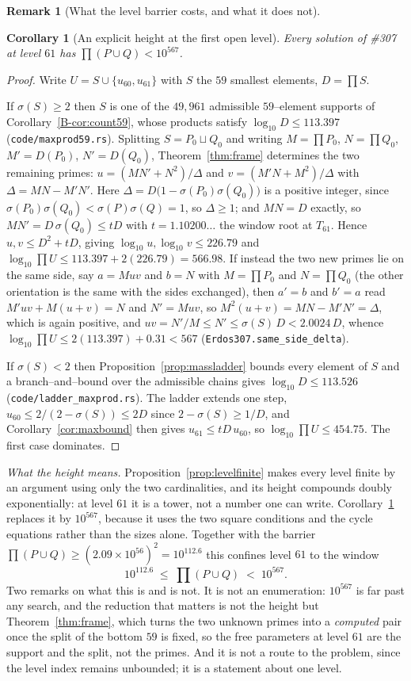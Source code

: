 \documentclass[11pt]{article}
\newtheorem{corollary}[theorem]{Corollary}
\theoremstyle{definition}
\newtheorem{remark}[theorem]{Remark}
\begin{document}
\begin{remark}[What the level barrier costs, and what it does not]
\begin{corollary}[An explicit height at the first open level]\label{cor:level61height}
Every solution of \#307 at level $61$ has $\prod(P\cup Q)<10^{567}$.
\end{corollary}
\begin{proof}
Write $U=S\cup\{u_{60},u_{61}\}$ with $S$ the $59$ smallest elements, $D=\prod S$.

If $\sigma(S)\ge2$ then $S$ is one of the $49{,}961$ admissible $59$--element supports of
Corollary~\ref{B-cor:count59}, whose products satisfy $\log_{10}D\le113.397$
\textup{(\texttt{code/maxprod59.rs})}. Splitting $S=P_0\sqcup Q_0$ and writing $M=\prod P_0$,
$N=\prod Q_0$, $M'=D(P_0)$, $N'=D(Q_0)$, Theorem~\ref{thm:frame} determines the two remaining primes:
$u=(MN'+N^2)/\Delta$ and $v=(M'N+M^2)/\Delta$ with $\Delta=MN-M'N'$. Here
$\Delta=D\bigl(1-\sigma(P_0)\sigma(Q_0)\bigr)$ is a positive integer, since
$\sigma(P_0)\sigma(Q_0)<\sigma(P)\sigma(Q)=1$, so $\Delta\ge1$; and $MN=D$ exactly, so
$MN'=D\,\sigma(Q_0)\le tD$ with $t=1.10200\ldots$ the window root at $T_{61}$. Hence
$u,v\le D^2+tD$, giving $\log_{10}u,\log_{10}v\le226.79$ and
$\log_{10}\prod U\le113.397+2(226.79)=566.98$.
If instead the two new primes lie on the same side, say $a=Muv$ and $b=N$ with $M=\prod P_0$ and $N=\prod Q_0$ (the other
orientation is the same with the sides exchanged), then $a'=b$ and $b'=a$ read $M'uv+M(u+v)=N$ and $N'=Muv$, so
$M^2(u+v)=MN-M'N'=\Delta$, which is again positive, and $uv=N'/M\le N'\le\sigma(S)\,D<2.0024\,D$, whence
$\log_{10}\prod U\le2(113.397)+0.31<567$ \textup{(}\texttt{Erdos307.same\_side\_delta}\textup{)}.

If $\sigma(S)<2$ then Proposition~\ref{prop:massladder} bounds every element of $S$ and a
branch--and--bound over the admissible chains gives $\log_{10}D\le113.526$
\textup{(\texttt{code/ladder\_maxprod.rs})}. The ladder extends one step, $u_{60}\le2/(2-\sigma(S))\le2D$
since $2-\sigma(S)\ge1/D$, and Corollary~\ref{cor:maxbound} then gives $u_{61}\le tD\,u_{60}$, so
$\log_{10}\prod U\le454.75$. The first case dominates.
\end{proof}

\emph{What the height means.} Proposition~\ref{prop:levelfinite} makes every level finite by an argument using only the two
cardinalities, and its height compounds doubly exponentially: at level $61$ it is a tower, not a
number one can write. Corollary~\ref{cor:level61height} replaces it by $10^{567}$, because it uses
the two square conditions and the cycle equations rather than the sizes alone. Together with the
barrier $\prod(P\cup Q)\ge(2.09\times10^{56})^2=10^{112.6}$ this confines level $61$ to the window
\[ 10^{112.6}\;\le\;\prod(P\cup Q)\;<\;10^{567}. \]
Two remarks on what this is and is not. It is not an enumeration: $10^{567}$ is far past any search,
and the reduction that matters is not the height but Theorem~\ref{thm:frame}, which turns the two
unknown primes into a \emph{computed} pair once the split of the bottom $59$ is fixed, so the free
parameters at level $61$ are the support and the split, not the primes. And it is not a route to the
problem, since the level index remains unbounded; it is a statement about one level.



\end{remark}
\end{document}
